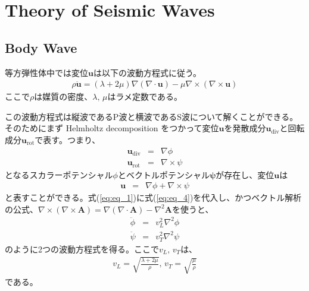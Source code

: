 
\chapter{Theory of Seismic Waves}
\section{Body Wave} %

等方弾性体中では変位$\bm{u}$は以下の波動方程式に従う。
\begin{eqnarray}\label{eq:eq_1}
  \rho{\bm{\ddot{u}}} = (\lambda+2\mu)\nabla(\nabla\cdot\bm{u}) - \mu\nabla\times(\nabla\times\bm{u})
\end{eqnarray}
ここで$\rho$は媒質の密度、$\lambda,\,\mu$はラメ定数である。

この波動方程式は縦波であるP波と横波であるS波について解くことができる。そのためにまず Helmholtz decomposition をつかって変位$\bm{u}$を発散成分$\bm{u}_{\mathrm{div}}$と回転成分$\bm{u}_{\mathrm{rot}}$で表す。つまり、
\begin{eqnarray}
  \bm{u}_{\mathrm{div}}&=&\nabla\phi \label{eq:eq_2}\\
  \bm{u}_{\mathrm{rot}}&=&\nabla\times\psi \label{eq:eq_3}
\end{eqnarray}
となるスカラーポテンシャル$\phi$とベクトルポテンシャル$\bm{\psi}$が存在し、変位$\bm{u}$は
\begin{eqnarray} 
  \bm{u} &=& \nabla\phi + \nabla\times\psi \label{eq:eq_4}
\end{eqnarray}
と表すことができる。式(\ref{eq:eq_1})に式(\ref{eq:eq_4})を代入し、かつベクトル解析の公式、$\nabla\times(\nabla\times\bm{A})=\nabla(\nabla\cdot\bm{A})-\nabla^2{\bm{A}}$を使うと、
\begin{eqnarray}
  \ddot{\phi} &=& v_{L}^2\nabla^2\phi \label{eq:eq_5}\\
  \ddot{\psi} &=& v_{T}^2\nabla^2\psi \label{eq:eq_6}
\end{eqnarray} 
のように2つの波動方程式を得る。ここで$v_{L},\,v_{T}$は、
\begin{eqnarray}
  v_{L} = \sqrt{\frac{\lambda+2\mu}{\rho}},\,v_{T} = \sqrt{\frac{\mu}{\rho}} \label{eq:eq_7}
\end{eqnarray} 
である。

